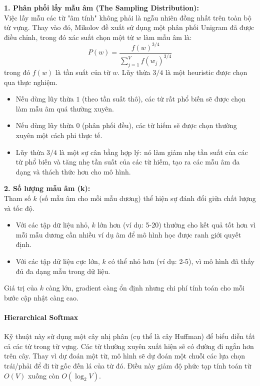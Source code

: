 \begin{tcolorbox}[
    title=Lựa chọn Thiết kế trong Negative Sampling,
    colback=orange!5!white, colframe=orange!60!black, fonttitle=\bfseries
]
\textbf{1. Phân phối lấy mẫu âm (The Sampling Distribution):} \\
Việc lấy mẫu các từ "âm tính" không phải là ngẫu nhiên đồng nhất trên toàn bộ từ vựng. Thay vào đó, Mikolov đề xuất sử dụng một phân phối Unigram đã được điều chỉnh, trong đó xác suất chọn một từ $w$ làm mẫu âm là:
\[ P(w) = \frac{f(w)^{3/4}}{\sum_{j=1}^{V} f(w_j)^{3/4}} \]
trong đó $f(w)$ là tần suất của từ $w$. Lũy thừa $3/4$ là một heuristic được chọn qua thực nghiệm.
\begin{itemize}
    \item Nếu dùng lũy thừa $1$ (theo tần suất thô), các từ rất phổ biến sẽ được chọn làm mẫu âm quá thường xuyên.
    \item Nếu dùng lũy thừa $0$ (phân phối đều), các từ hiếm sẽ được chọn thường xuyên một cách phi thực tế.
    \item Lũy thừa $3/4$ là một sự cân bằng hợp lý: nó làm giảm nhẹ tần suất của các từ phổ biến và tăng nhẹ tần suất của các từ hiếm, tạo ra các mẫu âm đa dạng và thách thức hơn cho mô hình.
\end{itemize}

\textbf{2. Số lượng mẫu âm (k):} \\
Tham số $k$ (số mẫu âm cho mỗi mẫu dương) thể hiện sự đánh đổi giữa chất lượng và tốc độ.
\begin{itemize}
    \item Với các tập dữ liệu nhỏ, $k$ lớn hơn (ví dụ: 5-20) thường cho kết quả tốt hơn vì mỗi mẫu dương cần nhiều ví dụ âm để mô hình học được ranh giới quyết định.
    \item Với các tập dữ liệu cực lớn, $k$ có thể nhỏ hơn (ví dụ: 2-5), vì mô hình đã thấy đủ đa dạng mẫu trong dữ liệu.
\end{itemize}
Giá trị của $k$ càng lớn, gradient càng ổn định nhưng chi phí tính toán cho mỗi bước cập nhật càng cao.
\end{tcolorbox}

\paragraph{Hierarchical Softmax}
Kỹ thuật này sử dụng một cây nhị phân (cụ thể là cây Huffman) để biểu diễn tất cả các từ trong từ vựng. Các từ thường xuyên xuất hiện sẽ có đường đi ngắn hơn trên cây. Thay vì dự đoán một từ, mô hình sẽ dự đoán một chuỗi các lựa chọn trái/phải để đi từ gốc đến lá của từ đó. Điều này giảm độ phức tạp tính toán từ $O(V)$ xuống còn $O(\log_2V)$.

